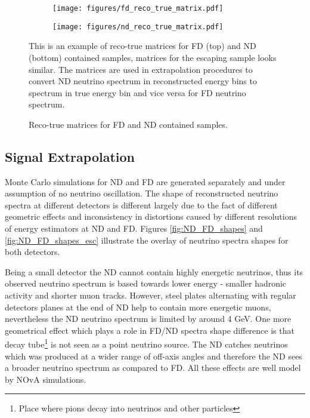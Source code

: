 \begin{figure}[th]
\centering
\begin{subfigure}[t]{0.95\textwidth}
  \centering
  \texttt{[image: figures/fd\_reco\_true\_matrix.pdf]}
\end{subfigure}
\vspace{0.5cm}
\newline
\begin{subfigure}[t]{0.95\textwidth}
  \centering
  \texttt{[image: figures/nd\_reco\_true\_matrix.pdf]}
\end{subfigure}
\caption{ Reco-true matrices for FD and ND contained samples. }
{ This is an example of reco-true matrices for FD (top) and ND (bottom) contained samples, matrices for the
escaping sample looks similar. The matrices are used in extrapolation procedures to convert ND neutrino spectrum
in reconstructed energy bins to spectrum in true energy bin and vice versa for FD neutrino spectrum. }
\label{fig:reco_true_matricies}
\end{figure}
\clearpage

\subsection{Signal Extrapolation} \label{extrap_procedure}
Monte Carlo simulations for ND and FD are generated separately and under assumption of no neutrino
oscillation. The shape of reconstructed neutrino spectra at different detectors is different largely due
to the fact of different geometric effects and inconsistency in distortions caused by different
resolutions of energy estimators at ND and FD. Figures \ref{fig:ND_FD_shapes} and \ref{fig:ND_FD_shapes_esc}
illustrate the overlay of neutrino spectra shapes for both detectors.

Being a small detector the ND cannot contain highly energetic neutrinos, thus its observed neutrino
spectrum is based towards lower energy - smaller hadronic activity and shorter muon tracks. However,
steel plates alternating with regular detectors planes at the end of ND help to contain more
energetic muons, nevertheless the ND neutrino spectrum is limited by around 4 GeV. One more geometrical effect
which plays a role in FD/ND spectra shape difference is that decay tube\footnote{Place where pions
decay into neutrinos and other particles} is not seen as a point neutrino source. The ND catches neutrinos
which was produced at a wider range of off-axis angles and therefore the ND sees a broader neutrino spectrum 
as compared to FD. All these effects are well model by NOvA simulations.

